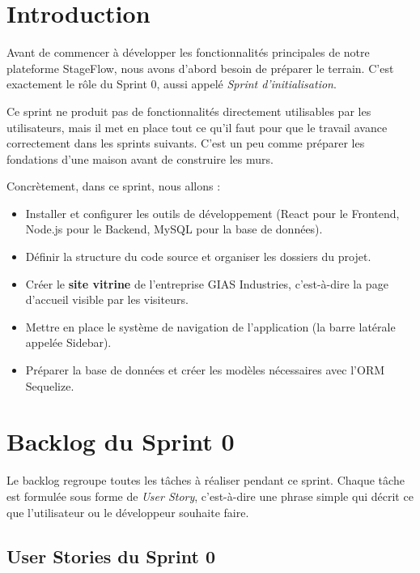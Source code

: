 
\section{Introduction}
Avant de commencer à développer les fonctionnalités principales de notre plateforme StageFlow, nous avons d'abord besoin de préparer le terrain. C'est exactement le rôle du Sprint 0, aussi appelé \textit{Sprint d'initialisation}.

Ce sprint ne produit pas de fonctionnalités directement utilisables par les utilisateurs, mais il met en place tout ce qu'il faut pour que le travail avance correctement dans les sprints suivants. C'est un peu comme préparer les fondations d'une maison avant de construire les murs.

Concrètement, dans ce sprint, nous allons :
\begin{itemize}
    \item Installer et configurer les outils de développement (React pour le Frontend, Node.js pour le Backend, MySQL pour la base de données).
    \item Définir la structure du code source et organiser les dossiers du projet.
    \item Créer le \textbf{site vitrine} de l'entreprise GIAS Industries, c'est-à-dire la page d'accueil visible par les visiteurs.
    \item Mettre en place le système de navigation de l'application (la barre latérale appelée Sidebar).
    \item Préparer la base de données et créer les modèles nécessaires avec l'ORM Sequelize.
\end{itemize}

\section{Backlog du Sprint 0}

Le backlog regroupe toutes les tâches à réaliser pendant ce sprint. Chaque tâche est formulée sous forme de \textit{User Story}, c'est-à-dire une phrase simple qui décrit ce que l'utilisateur ou le développeur souhaite faire.

\subsection{User Stories du Sprint 0}

